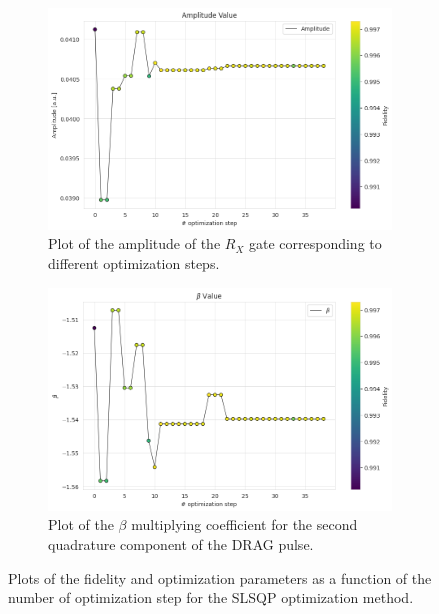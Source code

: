 \begin{figure}[htbp]
    \vspace{0.5cm}

    \begin{subfigure}[t]{0.45\textwidth}
        \includegraphics[width=\textwidth]{figures/png/RB_optimization/NM/post_ft_true/amplitude.png}
        \caption{Plot of the amplitude of the $R_X$ gate corresponding to different optimization steps.}
        \label{NM_true_fig:amplitude}
    \end{subfigure}
    \hfill
    \begin{subfigure}[t]{0.45\textwidth}
        \includegraphics[width=\textwidth]{figures/png/RB_optimization/NM/post_ft_true/beta.png}
        \caption{Plot of the $\beta$ multiplying coefficient for the second quadrature component of the DRAG pulse.}
        \label{NM_true_fig:beta}
    \end{subfigure}

    \caption{Plots of the fidelity and optimization parameters as a function of the number of optimization step for the SLSQP optimization method.}
    \label{fig:NM_plots}
\end{figure}

